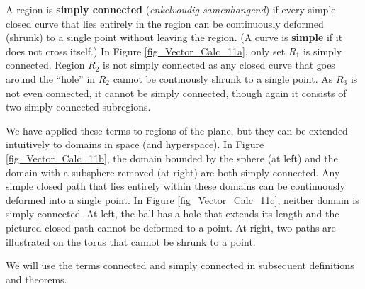 A region is \textbf{simply connected} (\textit{enkelvoudig samenhangend}) if every simple closed curve that lies entirely in the region can be continuously deformed (shrunk) to a single point without leaving the region.  (A curve is \textbf{simple} if it does not cross itself.) In Figure \ref{fig_Vector_Calc_11a}, only set $R_1$ is simply connected. Region $R_2$ is not simply connected as any closed curve that goes around the ``hole'' in $R_2$ cannot be continously shrunk to a single point. As $R_3$ is not even connected, it cannot be simply connected, though again it consists of two simply connected subregions. 

We have applied these terms to regions of the plane, but they can be extended intuitively to domains in space (and hyperspace). In Figure \ref{fig_Vector_Calc_11b}, the domain bounded by the sphere (at left) and the domain with a subsphere removed (at right) are both simply connected. Any simple closed path that lies entirely within these domains can be continuously deformed into a single point. In Figure \ref{fig_Vector_Calc_11c}, neither domain is simply connected. At left, the ball has a hole that extends its length and the pictured closed path cannot be deformed to a point. At right, two paths are illustrated on the torus that cannot be shrunk to a point. 

We will use the terms connected and simply connected in subsequent definitions and theorems.

